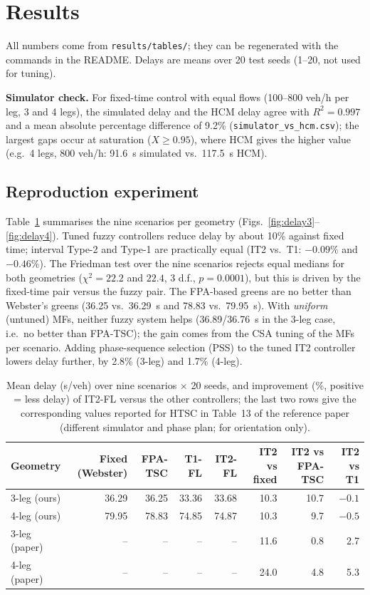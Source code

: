 \section{Results}
\label{sec:results}
All numbers come from \texttt{results/tables/}; they can be regenerated with the commands in the README. Delays are means over 20 test seeds (1--20, not used for tuning).

\textbf{Simulator check.} For fixed-time control with equal flows (100--800 veh/h per leg, 3 and 4 legs), the simulated delay and the HCM delay agree with $R^2=0.997$ and a mean absolute percentage difference of 9.2\% (\texttt{simulator\_vs\_hcm.csv}); the largest gaps occur at saturation ($X\ge 0.95$), where HCM gives the higher value (e.g.\ 4 legs, 800 veh/h: 91.6~s simulated vs.\ 117.5~s HCM).

\subsection{Reproduction experiment}
Table~\ref{tab:main} summarises the nine scenarios per geometry (Figs.~\ref{fig:delay3}--\ref{fig:delay4}). Tuned fuzzy controllers reduce delay by about 10\% against fixed time; interval Type-2 and Type-1 are practically equal (IT2 vs.\ T1: $-0.09\%$ and $-0.46\%$). The Friedman test over the nine scenarios rejects equal medians for both geometries ($\chi^2=22.2$ and $22.4$, 3 d.f., $p=0.0001$), but this is driven by the fixed-time pair versus the fuzzy pair. The FPA-based greens are no better than Webster's greens (36.25 vs.\ 36.29~s and 78.83 vs.\ 79.95~s). With \emph{uniform} (untuned) MFs, neither fuzzy system helps (36.89/36.76~s in the 3-leg case, i.e.\ no better than FPA-TSC); the gain comes from the CSA tuning of the MFs per scenario. Adding phase-sequence selection (PSS) to the tuned IT2 controller lowers delay further, by 2.8\% (3-leg) and 1.7\% (4-leg).

\begin{table}[t]
\centering\small
\caption{Mean delay (s/veh) over nine scenarios $\times$ 20 seeds, and improvement (\%, positive = less delay) of IT2-FL versus the other controllers; the last two rows give the corresponding values reported for HTSC in Table~13 of the reference paper \cite{ref_paper} (different simulator and phase plan; for orientation only).}\label{tab:main}
\begin{tabular}{@{}lrrrrrrr@{}}
\toprule
Geometry & Fixed (Webster) & FPA-TSC & T1-FL & IT2-FL & IT2 vs fixed & IT2 vs FPA-TSC & IT2 vs T1 \\ \midrule
3-leg (ours) & 36.29 & 36.25 & 33.36 & 33.68 & 10.3 & 10.7 & $-0.1$ \\
4-leg (ours) & 79.95 & 78.83 & 74.85 & 74.87 & 10.3 & 9.7 & $-0.5$ \\
3-leg (paper) & -- & -- & -- & -- & 11.6 & 0.8 & 2.7 \\
4-leg (paper) & -- & -- & -- & -- & 24.0 & 4.8 & 5.3 \\ \bottomrule
\end{tabular}
\end{table}

